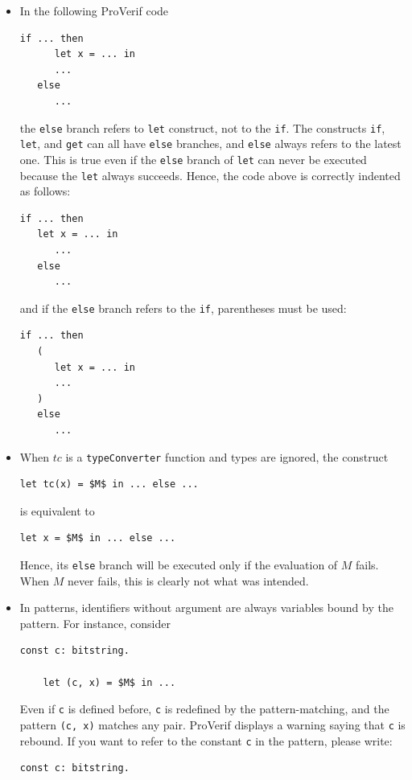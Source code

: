 \documentclass{book}
\begin{document}
\begin{itemize}
\item
In the following ProVerif code
\begin{lstlisting}[numbers=none]
   if ... then
      let x = ... in
      ...
   else
      ...
\end{lstlisting}
the \lstinline!else! branch refers to \lstinline!let! construct,
not to the \lstinline!if!. The constructs \lstinline!if!, \lstinline!let!,
and \lstinline!get! can all have \lstinline!else! branches, and
\lstinline!else! always refers to the latest one. This is true even if
the \lstinline!else! branch of \lstinline!let! can never be executed
because the \lstinline!let! always succeeds. Hence, the code
above is correctly indented as follows:
\begin{lstlisting}[numbers=none]
   if ... then
   let x = ... in
      ...
   else
      ...
\end{lstlisting}
and if the \lstinline!else! branch refers to the \lstinline!if!,
parentheses must be used:
\begin{lstlisting}[numbers=none]
   if ... then
   (
      let x = ... in
      ...
   )
   else
      ...
\end{lstlisting}

\item When $tc$ is a \lstinline!typeConverter! function and types are ignored,
the construct
\begin{lstlisting}[numbers=none]
   let tc(x) = $M$ in ... else ...
\end{lstlisting}
is equivalent to
\begin{lstlisting}[numbers=none]
   let x = $M$ in ... else ...
\end{lstlisting}
Hence, its \lstinline!else! branch will be executed only if
the evaluation of $M$ fails. When $M$ never fails, this is clearly
not what was intended.

\item In patterns, identifiers without argument are always
variables bound by the pattern. For instance, consider
\begin{lstlisting}[numbers=none]
    const c: bitstring.

    let (c, x) = $M$ in ...
\end{lstlisting}
Even if \lstinline!c! is defined before, \lstinline!c! is redefined
by the pattern-matching, and the pattern \lstinline!(c, x)! matches
any pair. ProVerif displays a warning saying that \lstinline!c! is
rebound. If you want to refer to the constant \lstinline!c! in the
pattern, please write:
\begin{lstlisting}[numbers=none]
    const c: bitstring.


\end{lstlisting}
\end{itemize}
\end{document}
